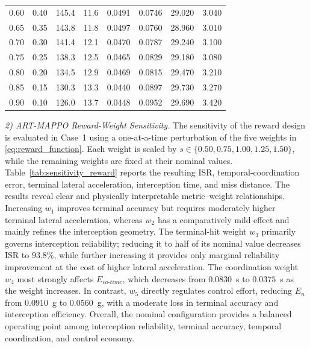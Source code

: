\documentclass[lettersize,journal]{IEEEtran}
\newcommand{\hladd}[1]{{\color{blue}#1}}
\begin{document}
\begin{table}[!t]
{{\begin{tabular}{@{}cccccccc@{}}
0.60 & 0.40 & 145.4 & 11.6 & 0.0491 & 0.0746 & 29.020 & 3.040 \\
0.65 & 0.35 & 143.8 & 11.8 & 0.0497 & 0.0760 & 28.960 & 3.010 \\
0.70 & 0.30 & 141.4 & 12.1 & 0.0470 & 0.0787 & 29.240 & 3.100 \\
0.75 & 0.25 & 138.3 & 12.5 & 0.0465 & 0.0829 & 29.180 & 3.080 \\
0.80 & 0.20 & 134.5 & 12.9 & 0.0469 & 0.0815 & 29.470 & 3.210 \\
0.85 & 0.15 & 130.3 & 13.3 & 0.0440 & 0.0897 & 29.730 & 3.270 \\
0.90 & 0.10 & 126.0 & 13.7 & 0.0448 & 0.0952 & 29.690 & 3.420 \\
\hline
\end{tabular}%
}}
\end{table}






\hladd{\emph{2) ART-MAPPO Reward-Weight Sensitivity.}
The sensitivity of the reward design is evaluated in Case~1 using a
one-at-a-time perturbation of the five weights in
\eqref{eq:reward_function}. Each weight is scaled by
$s\in\{0.50,0.75,1.00,1.25,1.50\}$, while the remaining weights are fixed at
their nominal values. Table~\ref{tab:sensitivity_reward} reports the resulting
ISR, temporal-coordination error, terminal lateral acceleration, interception time, and
miss distance. The results reveal clear and physically interpretable
metric--weight relationships. Increasing $w_1$ improves terminal accuracy but
requires moderately higher terminal lateral acceleration, whereas $w_2$ has a comparatively
mild effect and mainly refines the interception geometry. The terminal-hit
weight $w_3$ primarily governs interception reliability; reducing it to half
of its nominal value decreases ISR to $93.8\%$, while further increasing it
provides only marginal reliability improvement at the cost of higher lateral acceleration.
The coordination weight $w_4$ most strongly affects
$E_{co\text{-}time}$, which decreases from $0.0830$~s to $0.0375$~s as the
weight increases. In contrast, $w_5$ directly regulates control effort,
reducing $E_n$ from $0.0910$~g to $0.0560$~g, with a moderate loss in terminal
accuracy and interception efficiency. Overall, the nominal configuration
provides a balanced operating point among interception reliability, terminal
accuracy, temporal coordination, and control economy.}
\end{document}
